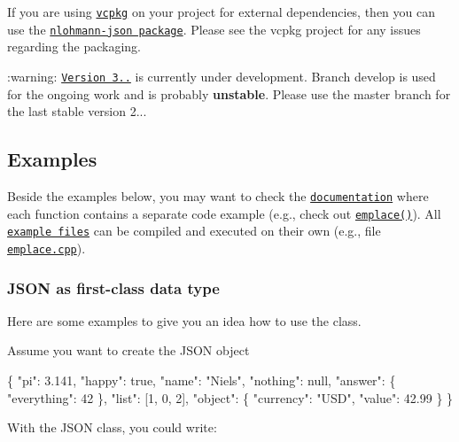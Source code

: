 If you are using \href{https://github.com/Microsoft/vcpkg/}{\tt vcpkg} on your project for external dependencies, then you can use the \href{https://github.com/Microsoft/vcpkg/tree/master/ports/nlohmann-json}{\tt nlohmann-\/json package}. Please see the vcpkg project for any issues regarding the packaging.

\+:warning\+: \href{https://github.com/nlohmann/json/wiki/Road-toward-3.0.0}{\tt Version 3..} is currently under development. Branch {\ttfamily develop} is used for the ongoing work and is probably {\bfseries unstable}. Please use the {\ttfamily master} branch for the last stable version 2...

\subsection*{Examples}

Beside the examples below, you may want to check the \href{https://nlohmann.github.io/json/}{\tt documentation} where each function contains a separate code example (e.\+g., check out \href{https://nlohmann.github.io/json/classnlohmann_1_1basic__json_a602f275f0359ab181221384989810604.html#a602f275f0359ab181221384989810604}{\tt {\ttfamily emplace()}}). All \href{https://github.com/nlohmann/json/tree/develop/doc/examples}{\tt example files} can be compiled and executed on their own (e.\+g., file \href{https://github.com/nlohmann/json/blob/develop/doc/examples/emplace.cpp}{\tt emplace.\+cpp}).

\subsubsection*{J\+S\+ON as first-\/class data type}

Here are some examples to give you an idea how to use the class.

Assume you want to create the J\+S\+ON object


\begin{DoxyCode}
\{
  "pi": 3.141,
  "happy": true,
  "name": "Niels",
  "nothing": null,
  "answer": \{
    "everything": 42
  \},
  "list": [1, 0, 2],
  "object": \{
    "currency": "USD",
    "value": 42.99
  \}
\}
\end{DoxyCode}


With the J\+S\+ON class, you could write\+:


